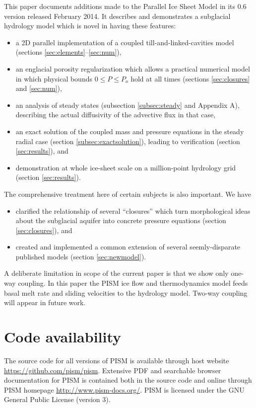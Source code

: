 \documentclass[gmd]{copernicus}   %
\begin{document}
\conclusions  \label{sec:conclusion}  This paper documents additions made to the Parallel Ice Sheet Model in its 0.6 version released February 2014.  It describes and demonstrates a subglacial hydrology model which is novel in having these features:\begin{itemize}
\item a 2D parallel implementation of a coupled till-and-linked-cavities model (sections \ref{sec:elements}--\ref{sec:num}),
\item an englacial porosity regularization which allows a practical numerical model in which physical bounds $0\le P \le P_o$ hold at all times (sections \ref{sec:closures} and \ref{sec:num}),
\item an analysis of steady states (subsection \ref{subsec:steady} and Appendix A), describing the actual diffusivity of the advective flux in that case,
\item an exact solution of the coupled mass and pressure equations in the steady radial case (section \ref{subsec:exactsolution}), leading to verification (section \ref{sec:results}), and
\item demonstration at whole ice-sheet scale on a million-point hydrology grid (section \ref{sec:results}).
\end{itemize}
The comprehensive treatment here of certain subjects is also important.  We have
\begin{itemize}
\item clarified the relationship of several ``closures'' which turn morphological ideas about the subglacial aquifer into concrete pressure equations (section \ref{sec:closures}), and
\item created and implemented a common extension of several seemly-disparate published models (section \ref{sec:newmodel}).
\end{itemize}
A deliberate limitation in scope of the current paper is that we show only one-way coupling.  In this paper the PISM ice flow and thermodynamics model feeds basal melt rate and sliding velocities to the hydrology model.  Two-way coupling  will appear in future work.


\section{Code availability}  \label{sec:availability}

The source code for all versions of PISM is available through host website \url{https://github.com/pism/pism}.  Extensive PDF and searchable browser documentation for PISM is contained both in the source code and online through PISM homepage \url{http://www.pism-docs.org/}.  PISM is licensed under the GNU General Public License (version 3).
\end{document}
